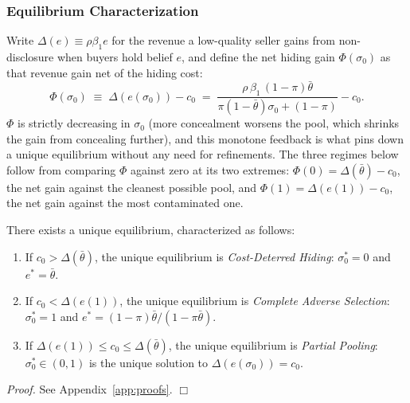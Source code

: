 \subsubsection{Equilibrium Characterization}

Write $\Delta(e)\equiv\rho\beta_1 e$ for the revenue a low-quality seller gains from non-disclosure when buyers hold belief $e$, and define the net hiding gain $\Phi(\sigma_0)$ as that revenue gain net of the hiding cost:
\begin{equation}
    \Phi(\sigma_0) \;\equiv\; \Delta\!\left(e(\sigma_0)\right) - c_0 \;=\; \frac{\rho\,\beta_1\,(1-\pi)\bar{\theta}}{\pi(1-\bar{\theta})\sigma_0 + (1-\pi)} - c_0.
    \label{eq:Phi}
\end{equation}
$\Phi$ is strictly decreasing in $\sigma_0$ (more concealment worsens the pool, which shrinks the gain from concealing further), and this monotone feedback is what pins down a unique equilibrium without any need for refinements. The three regimes below follow from comparing $\Phi$ against zero at its two extremes: $\Phi(0)=\Delta(\bar{\theta})-c_0$, the net gain against the cleanest possible pool, and $\Phi(1)=\Delta(e(1))-c_0$, the net gain against the most contaminated one.

\begin{proposition}
\label{prop:equilibrium}
There exists a unique equilibrium, characterized as follows:
\begin{enumerate}[label=(\roman*)]
    \item If $c_0>\Delta(\bar{\theta})$, the unique equilibrium is \emph{Cost-Deterred Hiding}: $\sigma_0^*=0$ and $e^*=\bar{\theta}$.
    \item If $c_0<\Delta(e(1))$, the unique equilibrium is \emph{Complete Adverse Selection}: $\sigma_0^*=1$ and $e^*=(1-\pi)\bar{\theta}/(1-\pi\bar{\theta})$.
    \item If $\Delta(e(1))\leq c_0\leq\Delta(\bar{\theta})$, the unique equilibrium is \emph{Partial Pooling}: $\sigma_0^*\in(0,1)$ is the unique solution to $\Delta(e(\sigma_0))=c_0$.
\end{enumerate}
\end{proposition}

\noindent\textit{Proof.} See Appendix~\ref{app:proofs}. $\Box$


